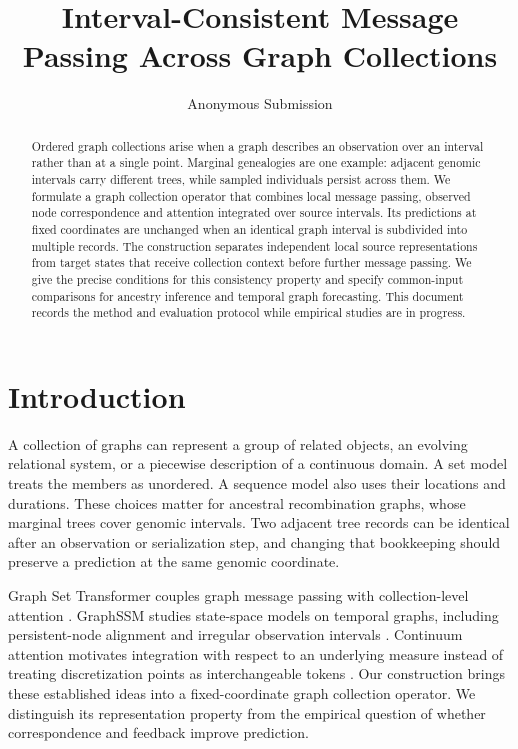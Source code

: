 \documentclass[letterpaper]{article}
\title{Interval-Consistent Message Passing Across Graph Collections}
\author{Anonymous Submission}
\begin{document}
\maketitle
\begin{abstract}
Ordered graph collections arise when a graph describes an observation over an interval rather than at a single point. Marginal genealogies are one example: adjacent genomic intervals carry different trees, while sampled individuals persist across them. We formulate a graph collection operator that combines local message passing, observed node correspondence and attention integrated over source intervals. Its predictions at fixed coordinates are unchanged when an identical graph interval is subdivided into multiple records. The construction separates independent local source representations from target states that receive collection context before further message passing. We give the precise conditions for this consistency property and specify common-input comparisons for ancestry inference and temporal graph forecasting. This document records the method and evaluation protocol while empirical studies are in progress.
\end{abstract}

\section{Introduction}
A collection of graphs can represent a group of related objects, an evolving relational system, or a piecewise description of a continuous domain. A set model treats the members as unordered. A sequence model also uses their locations and durations. These choices matter for ancestral recombination graphs, whose marginal trees cover genomic intervals. Two adjacent tree records can be identical after an observation or serialization step, and changing that bookkeeping should preserve a prediction at the same genomic coordinate.

Graph Set Transformer couples graph message passing with collection-level attention \citep{gst2026}. GraphSSM studies state-space models on temporal graphs, including persistent-node alignment and irregular observation intervals \citep{graphssm2024}. Continuum attention motivates integration with respect to an underlying measure instead of treating discretization points as interchangeable tokens \citep{continuum2024}. Our construction brings these established ideas into a fixed-coordinate graph collection operator. We distinguish its representation property from the empirical question of whether correspondence and feedback improve prediction.
\end{document}
